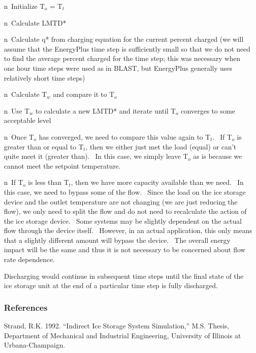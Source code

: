 n~Initialize T\(_{o}\) = T\(_{t}\)

n~Calculate LMTD*

n~Calculate q* from charging equation for the current percent charged (we will assume that the EnergyPlus time step is sufficiently small so that we do not need to find the average percent charged for the time step; this was necessary when one hour time steps were used as in BLAST, but EnergyPlus generally uses relatively short time steps)

n~Calculate T\(_{w}\) and compare it to T\(_{o}\)

n~Use T\(_{w}\) to calculate a new LMTD* and iterate until T\(_{o}\) converges to some acceptable level

n~Once T\(_{o}\) has converged, we need to compare this value again to T\(_{t}\).~ If T\(_{o}\) is greater than or equal to T\(_{t}\), then we either just met the load (equal) or can't quite meet it (greater than).~ In this case, we simply leave T\(_{o}\) as is because we cannot meet the setpoint temperature.

n~If T\(_{o}\) is less than T\(_{t}\), then we have more capacity available than we need.~ In this case, we need to bypass some of the flow.~ Since the load on the ice storage device and the outlet temperature are not changing (we are just reducing the flow), we only need to split the flow and do not need to recalculate the action of the ice storage device.~ Some systems may be slightly dependent on the actual flow through the device itself.~ However, in an actual application, this only means that a slightly different amount will bypass the device.~ The overall energy impact will be the same and thus it is not necessary to be concerned about flow rate dependence.

Discharging would continue in subsequent time steps until the final state of the ice storage unit at the end of a particular time step is fully discharged.

\subsubsection{References}\label{references-1-011}

Strand, R.K. 1992. ``Indirect Ice Storage System Simulation,'' M.S. Thesis, Department of Mechanical and Industrial Engineering, University of Illinois at Urbana-Champaign.
